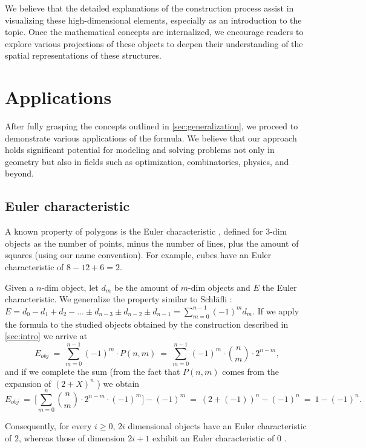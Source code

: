 \documentclass{article}
\begin{document}
	We believe that the detailed explanations of the construction process assist in visualizing these high-dimensional elements, especially as an introduction to the topic. Once the mathematical concepts are internalized, we encourage readers to explore various projections of these objects to deepen their understanding of the spatial representations of these structures.
	
	\section{Applications \label{sec:apps}}
	
	After fully grasping the concepts outlined in \autoref{sec:generalization}, we proceed to demonstrate various applications of the formula. We believe that our approach holds significant potential for modeling and solving problems not only in geometry but also in fields such as optimization, combinatorics, physics, and beyond.
	
	\subsection{Euler characteristic \label{sec:euler}}
	
	A known property of polygons is the Euler characteristic \cite{euler}, defined for $3$-dim objects as the number of points, minus the number of lines, plus the amount of squares (using our name convention). For example, cubes have an Euler characteristic of $8 - 12 + 6 = 2$.

	Given a $n$-dim object, let $d_m$ be the amount of $m$-dim objects and $E$ the Euler characteristic. We generalize the property similar to Schläfli \cite{coxeter1973regular}: $E=d_{0}-d_{1}+d_{2}- ... \pm d_{n-3}\pm d_{n-2}\pm d_{n-1} = \sum_{m=0}^{n-1}(-1)^{m}d_{m}$. If we apply the formula to the studied objects obtained by the construction described in \autoref{sec:intro} we arrive at
	$$E_{obj} \ = \ \sum_{m=0}^{n-1}(-1)^{m} \cdot P(n,m)\ =\ \sum_{m=0}^{n-1}(-1)^{m} \cdot \binom{n}{m} \cdot 2^{n-m},$$
	and if we complete the sum (from the fact that $P(n,m)$ comes from the expansion of $(2 + X)^{n}$ \cite{coxeter1973regular}) we obtain
	$$E_{obj} \ =\ \Bigg[\sum_{m=0}^{n} \binom{n}{m} \cdot 2^{n-m} \cdot (-1)^{m}\Bigg] - (-1)^m \ = \ (2 + (-1))^{n}-(-1)^{n} \ = \ 1-(-1)^{n}.$$
	
	Consequently, for every $i \geq 0$, $2i$ dimensional objects have an Euler characteristic of $2$, whereas those of dimension $2i+1$ exhibit an Euler characteristic of $0$ \cite{coxeter1973regular}.
	
\end{document}
